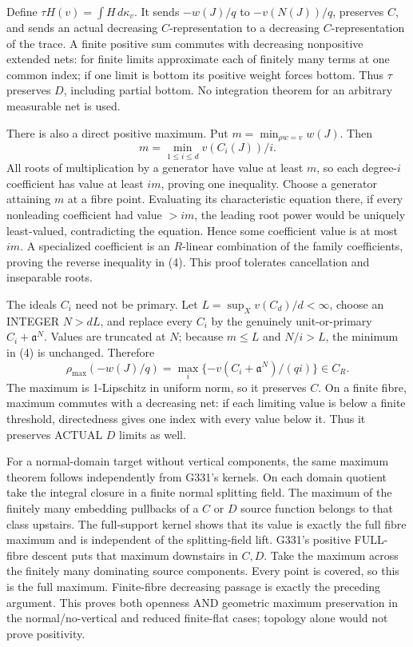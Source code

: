 Define $\tau H(v)=\int H\,d\kappa_v$. It sends $-w(J)/q$ to $-v(N(J))/q$, preserves $C$, and sends an actual decreasing $C$-representation to a decreasing $C$-representation of the trace. A finite positive sum commutes with decreasing nonpositive extended nets: for finite limits approximate each of finitely many terms at one common index; if one limit is bottom its positive weight forces bottom. Thus $\tau$ preserves $D$, including partial bottom. No integration theorem for an arbitrary measurable net is used.

There is also a direct positive maximum. Put $m=\min_{\rho w=v}w(J)$. Then
\[
m=\min_{1\le i\le d}v(C_i(J))/i.                      \tag{4}
\]
All roots of multiplication by a generator have value at least $m$, so each degree-$i$ coefficient has value at least $im$, proving one inequality. Choose a generator attaining $m$ at a fibre point. Evaluating its characteristic equation there, if every nonleading coefficient had value $>im$, the leading root power would be uniquely least-valued, contradicting the equation. Hence some coefficient value is at most $im$. A specialized coefficient is an $R$-linear combination of the family coefficients, proving the reverse inequality in (4). This proof tolerates cancellation and inseparable roots.

The ideals $C_i$ need not be primary. Let $L=\sup_X v(C_d)/d<\infty$, choose an INTEGER $N>dL$, and replace every $C_i$ by the genuinely unit-or-primary $C_i+\mathfrak a^N$. Values are truncated at $N$; because $m\le L$ and $N/i>L$, the minimum in (4) is unchanged. Therefore
\[
\rho_{\max}(-w(J)/q)=\max_i\{-v(C_i+\mathfrak a^N)/(qi)\}\in C_R. \tag{5}
\]
The maximum is 1-Lipschitz in uniform norm, so it preserves $C$. On a finite fibre, maximum commutes with a decreasing net: if each limiting value is below a finite threshold, directedness gives one index with every value below it. Thus it preserves ACTUAL $D$ limits as well.

For a normal-domain target without vertical components, the same maximum theorem follows independently from G331's kernels. On each domain quotient take the integral closure in a finite normal splitting field. The maximum of the finitely many embedding pullbacks of a $C$ or $D$ source function belongs to that class upstairs. The full-support kernel shows that its value is exactly the full fibre maximum and is independent of the splitting-field lift. G331's positive FULL-fibre descent puts that maximum downstairs in $C,D$. Take the maximum across the finitely many dominating source components. Every point is covered, so this is the full maximum. Finite-fibre decreasing passage is exactly the preceding argument. This proves both openness AND geometric maximum preservation in the normal/no-vertical and reduced finite-flat cases; topology alone would not prove positivity.
